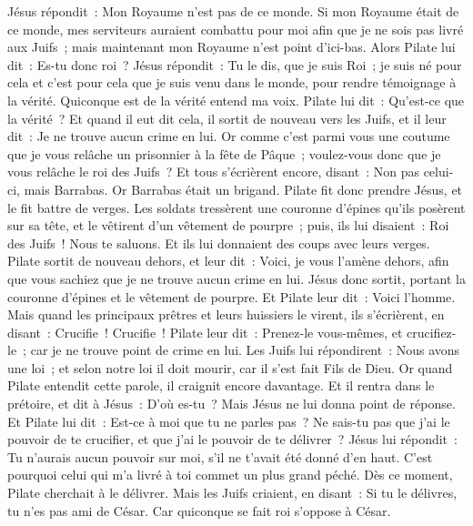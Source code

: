 \begin{multicols}{2}
Jésus répondit~: Mon Royaume n'est pas de ce monde. Si mon Royaume était de ce monde, mes serviteurs auraient combattu pour moi afin que je ne sois pas livré aux Juifs~; mais maintenant mon Royaume n'est point d'ici-bas.
Alors Pilate lui dit~: Es-tu donc roi~? Jésus répondit~: Tu le dis, que je suis Roi~; je suis né pour cela et c'est pour cela que je suis venu dans le monde, pour rendre témoignage à la vérité. Quiconque est de la vérité entend ma voix.
Pilate lui dit~: Qu'est-ce que la vérité~? Et quand il eut dit cela, il sortit de nouveau vers les Juifs, et il leur dit~: Je ne trouve aucun crime en lui.
Or comme c'est parmi vous une coutume que je vous relâche un prisonnier à la fête de Pâque~; voulez-vous donc que je vous relâche le roi des Juifs~?
Et tous s'écrièrent encore, disant~: Non pas celui-ci, mais Barrabas. Or Barrabas était un brigand.
\VerseOne{}Pilate fit donc prendre Jésus, et le fit battre de verges.
Les soldats tressèrent une couronne d'épines qu'ils posèrent sur sa tête, et le vêtirent d'un vêtement de pourpre~;
puis, ils lui disaient~: Roi des Juifs~! Nous te saluons. Et ils lui donnaient des coups avec leurs verges.
Pilate sortit de nouveau dehors, et leur dit~: Voici, je vous l'amène dehors, afin que vous sachiez que je ne trouve aucun crime en lui.
Jésus donc sortit, portant la couronne d'épines et le vêtement de pourpre. Et Pilate leur dit~: Voici l'homme.
Mais quand les principaux prêtres et leurs huissiers le virent, ils s'écrièrent, en disant~: Crucifie~! Crucifie~! Pilate leur dit~: Prenez-le vous-mêmes, et crucifiez-le~; car je ne trouve point de crime en lui.
Les Juifs lui répondirent~: Nous avons une loi~; et selon notre loi il doit mourir, car il s'est fait Fils de Dieu.
Or quand Pilate entendit cette parole, il craignit encore davantage.
Et il rentra dans le prétoire, et dit à Jésus~: D'où es-tu~? Mais Jésus ne lui donna point de réponse.
Et Pilate lui dit~: Est-ce à moi que tu ne parles pas~? Ne sais-tu pas que j'ai le pouvoir de te crucifier, et que j'ai le pouvoir de te délivrer~?
Jésus lui répondit~: Tu n'aurais aucun pouvoir sur moi, s'il ne t'avait été donné d'en haut. C'est pourquoi celui qui m'a livré à toi commet un plus grand péché.
Dès ce moment, Pilate cherchait à le délivrer. Mais les Juifs criaient, en disant~: Si tu le délivres, tu n'es pas ami de César. Car quiconque se fait roi s'oppose à César.

\end{multicols}
